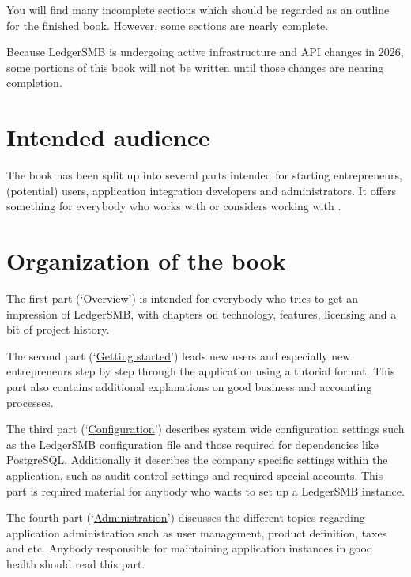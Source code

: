 You will find many incomplete sections which should be regarded as an outline for the finished book.
However, some sections are nearly complete.

Because LedgerSMB is undergoing active infrastructure and API changes in 2026, some portions of this book will not be written until those changes are nearing completion.

\section*{Intended audience}
\label{sec-intended-audience}

The book has been split up into several parts intended for starting entrepreneurs,
(potential) users, application integration developers and
administrators.
It offers something for everybody who works with or considers working with \lsmb.

\section*{Organization of the book}
\label{sec-book-organization}

The first
part (\lq\hyperref[part-overview]{Overview}\rq) is intended for everybody who tries to get an impression of LedgerSMB, with
chapters on technology, features, licensing and a bit of project history.

The second part
(\lq\hyperref[part-getting-started]{Getting started}\rq) leads new users and especially new entrepreneurs step by step through the
application using a tutorial format. This part also contains additional explanations on good business and accounting
processes.

The third part (\lq\hyperref[part-configuration]{Configuration}\rq) describes system wide configuration settings such as
the LedgerSMB configuration file and those required for dependencies like PostgreSQL. Additionally
it describes the company specific settings within the application, such as audit control settings
and required special accounts. This part is required material for anybody who wants to set up
a LedgerSMB instance.

The fourth part (\lq\hyperref[part-administration]{Administration}\rq) discusses the different topics
regarding application administration such as user management, product definition, taxes and etc.
Anybody responsible for maintaining application instances in good health should read this part.

